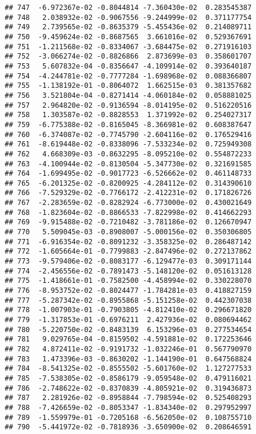 \documentclass[
]{article}
\begin{document}
\begin{verbatim}
## 747  -6.972367e-02 -0.8044814 -7.360430e-02  0.283545387
## 748   2.038932e-02 -0.9067556 -9.244999e-02  0.371177754
## 749   2.739565e-02 -0.8635379 -5.455436e-02  0.214089711
## 750  -9.459624e-02 -0.8687565  3.661016e-02  0.529367691
## 751  -1.211568e-02 -0.8334067 -3.684475e-02  0.271916103
## 752  -3.066274e-02 -0.8826866  2.873699e-03  0.358601707
## 753   5.607832e-04 -0.8356647 -4.109914e-02  0.393640187
## 754  -4.244781e-02 -0.7777284 -1.698968e-02  0.088366807
## 755  -1.138192e-01 -0.8064072  1.662515e-03  0.381357682
## 756   3.521804e-04 -0.8271414 -4.060184e-02  0.058881025
## 757   2.964820e-02 -0.9136594 -8.014195e-02  0.516220516
## 758   1.303587e-02 -0.8828553  1.371992e-02  0.254027317
## 759  -6.775388e-02 -0.8165045 -8.366981e-02  0.608387647
## 760  -6.374087e-02 -0.7745790 -2.604116e-02  0.176529416
## 761  -8.619448e-02 -0.8338096 -7.533234e-02  0.725949308
## 762   4.668309e-03 -0.8632295 -8.095210e-02  0.554872233
## 763  -4.100944e-02 -0.8130504 -5.347730e-02  0.321691585
## 764  -1.699495e-02 -0.9017723 -6.526662e-02  0.461148733
## 765  -6.201325e-02 -0.8200925 -4.284112e-02  0.314390610
## 766  -7.529329e-02 -0.7766172 -2.412231e-02  0.171826726
## 767  -2.283659e-02 -0.8282924 -6.773000e-02  0.430021649
## 768  -1.823604e-02 -0.8866533 -7.822998e-02  0.414662293
## 769  -9.915488e-02 -0.7210482 -3.781186e-02  0.126670947
## 770   5.509045e-03 -0.8908007 -5.000156e-02  0.350306805
## 771  -6.916354e-02 -0.8091232 -3.358325e-02  0.286487142
## 772  -1.605664e-01 -0.7799883 -2.847496e-02  0.272137862
## 773  -9.579406e-02 -0.8083177 -6.129477e-03  0.309171144
## 774  -2.456556e-02 -0.7891473 -5.148120e-02  0.051613128
## 775  -1.418661e-01 -0.7582500 -4.458994e-02  0.330228070
## 776  -8.953752e-02 -0.8024477 -1.784281e-03  0.418827159
## 777  -5.287342e-02 -0.8955868 -5.151258e-02  0.442307038
## 778  -1.007903e-01 -0.7903805 -4.812410e-02  0.296671820
## 779  -1.317853e-01 -0.6976211  2.427936e-02  0.080694462
## 780  -5.220750e-02 -0.8483139  6.153296e-03  0.277534654
## 781   9.029765e-04 -0.8159502 -4.591881e-02  0.172253646
## 782   4.872411e-02 -0.9191732 -1.032246e-01  0.567790970
## 783   1.473396e-03 -0.8630202 -1.144190e-01  0.647568824
## 784  -8.541325e-02 -0.8555502 -5.601760e-02  1.127277533
## 785  -7.538305e-02 -0.8586179 -9.059548e-02  0.479116021
## 786  -2.748622e-02 -0.8370839 -4.805921e-02  0.319436873
## 787   2.281926e-02 -0.8958844 -7.798594e-02  0.525408293
## 788  -7.426659e-02 -0.8053347 -1.834340e-02  0.297952997
## 789  -1.559979e-01 -0.7205168 -6.562050e-02  0.108755710
## 790  -5.441972e-02 -0.7818936 -3.650900e-02  0.208646591

\end{verbatim}
\end{document}
